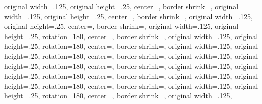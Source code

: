 {{	original width=.125\pgfpageoptionheight,%
	original height=.25\pgfpageoptionwidth,%
	center=\pgfpoint{.25\pgfphysicalwidth}{.125\pgfphysicalheight},%
}%
{%
	border shrink=\pgfpageoptionborder,%
	original width=.125\pgfpageoptionheight,%
	original height=.25\pgfpageoptionwidth,%
	center=\pgfpoint{.5\pgfphysicalwidth}{.125\pgfphysicalheight},%
}%
{%
	border shrink=\pgfpageoptionborder,%
	original width=.125\pgfpageoptionheight,%
	original height=.25\pgfpageoptionwidth,%
	center=\pgfpoint{.75\pgfphysicalwidth}{.125\pgfphysicalheight},%
}%
%
%
  {%
	border shrink=\pgfpageoptionborder,%
	original width=.125\pgfpageoptionheight,%
	original height=.25\pgfpageoptionwidth,%
	rotation=180,%
	center=\pgfpoint{1\pgfphysicalwidth}{.875\pgfphysicalheight},%
  }%
  {%
	border shrink=\pgfpageoptionborder,%
	original width=.125\pgfpageoptionheight,%
	original height=.25\pgfpageoptionwidth,%
	rotation=180,%
	center=\pgfpoint{0.75\pgfphysicalwidth}{.875\pgfphysicalheight},%
	}%
  {%
	border shrink=\pgfpageoptionborder,%
	original width=.125\pgfpageoptionheight,%
	original height=.25\pgfpageoptionwidth,%
	rotation=180,%
	center=\pgfpoint{.5\pgfphysicalwidth}{.875\pgfphysicalheight},%
  }%
  {%
	border shrink=\pgfpageoptionborder,%
	original width=.125\pgfpageoptionheight,%
	original height=.25\pgfpageoptionwidth,%
	rotation=180,%
	center=\pgfpoint{.25\pgfphysicalwidth}{.875\pgfphysicalheight},%
  }%
  {%
	border shrink=\pgfpageoptionborder,%
	original width=.125\pgfpageoptionheight,%
	original height=.25\pgfpageoptionwidth,%
	rotation=180,%
	center=\pgfpoint{1\pgfphysicalwidth}{.75\pgfphysicalheight},%
  }%
  {%
	border shrink=\pgfpageoptionborder,%
	original width=.125\pgfpageoptionheight,%
	original height=.25\pgfpageoptionwidth,%
	rotation=180,%
	center=\pgfpoint{0.75\pgfphysicalwidth}{.75\pgfphysicalheight},%
	}%
  {%
	border shrink=\pgfpageoptionborder,%
	original width=.125\pgfpageoptionheight,%
	original height=.25\pgfpageoptionwidth,%
	rotation=180,%
	center=\pgfpoint{.5\pgfphysicalwidth}{.75\pgfphysicalheight},%
  }%
  {%
	border shrink=\pgfpageoptionborder,%
	original width=.125\pgfpageoptionheight,%
}}

